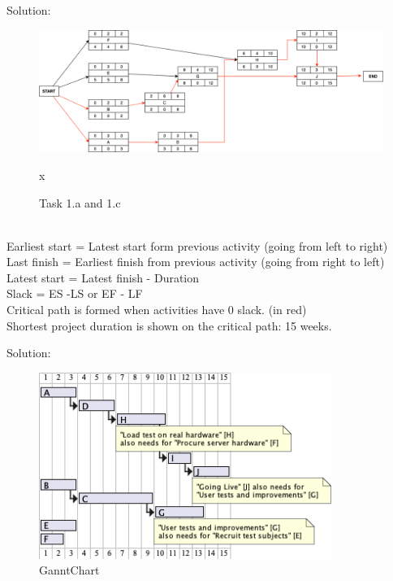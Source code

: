 \begin{parlist}
	\item Solution: 
	\begin{figure}[hbt]
	\centering
  \includegraphics[width=1.4\textwidth]{Immagini/ND.png}
	  \caption{Task 1.a and 1.c}x
\end{figure}
\\
Earliest start = Latest start form previous activity (going from left to right)\\
Last finish = Earliest finish from previous activity (going from right to left)\\
Latest start = Latest finish - Duration\\
Slack = ES -LS or EF - LF\\
Critical path is formed when activities have 0 slack. (in red)\\
Shortest project duration is shown on the critical path: 15 weeks.\cite{CriticalPath}

	\item Solution:
\begin{figure}[hbt]
	\centering
  \includegraphics[width=0.85\textwidth]{Immagini/ganntChart.png}
  \caption{GanntChart}
\end{figure}
\end{parlist}